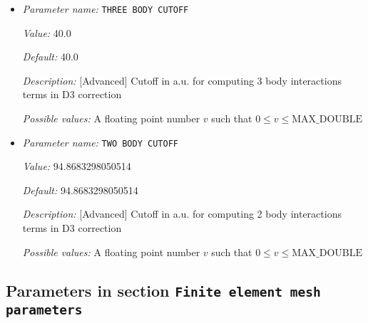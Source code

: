 \begin{itemize}
{\it Possible values:} An integer $n$ such that $0\leq n \leq 2$
\item {\it Parameter name:} {\tt THREE BODY CUTOFF}
\label{parameters:DFT functional parameters/Dispersion Correction/THREE BODY CUTOFF}
\label{parameters:DFT_20functional_20parameters/Dispersion_20Correction/THREE_20BODY_20CUTOFF}


{\it Value:} 40.0


{\it Default:} 40.0


{\it Description:} [Advanced] Cutoff in a.u. for computing 3 body interactions terms in D3 correction


{\it Possible values:} A floating point number $v$ such that $0 \leq v \leq \text{MAX\_DOUBLE}$
\item {\it Parameter name:} {\tt TWO BODY CUTOFF}
\label{parameters:DFT functional parameters/Dispersion Correction/TWO BODY CUTOFF}
\label{parameters:DFT_20functional_20parameters/Dispersion_20Correction/TWO_20BODY_20CUTOFF}


{\it Value:} 94.8683298050514


{\it Default:} 94.8683298050514


{\it Description:} [Advanced] Cutoff in a.u. for computing 2 body interactions terms in D3 correction


{\it Possible values:} A floating point number $v$ such that $0 \leq v \leq \text{MAX\_DOUBLE}$
\end{itemize}

\subsection{Parameters in section \tt Finite element mesh parameters}
\label{parameters:Finite_20element_20mesh_20parameters}

